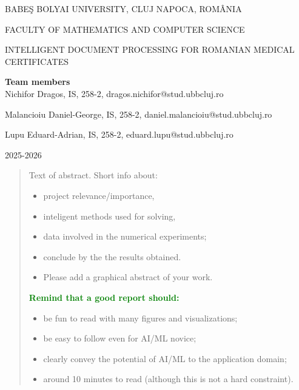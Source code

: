 \documentclass[runningheads,a4paper,11pt]{report}
\begin{document}
\begin{titlepage}
\sloppy

\begin{center}
BABE\c S BOLYAI UNIVERSITY, CLUJ NAPOCA, ROM\^ ANIA

FACULTY OF MATHEMATICS AND COMPUTER SCIENCE

\vspace{6cm}

\Huge \textbf{}

\vspace{1cm}

\normalsize INTELLIGENT DOCUMENT PROCESSING FOR ROMANIAN MEDICAL CERTIFICATES

\end{center}


\vspace{5cm}

\begin{flushright}
\Large{\textbf{Team members}}\\
Nichifor Dragos, IS, 258-2, dragos.nichifor@stud.ubbcluj.ro

Malancioiu Daniel-George, IS, 258-2, daniel.malancioiu@stud.ubbcluj.ro

Lupu Eduard-Adrian, IS, 258-2, eduard.lupu@stud.ubbcluj.ro
\end{flushright}

\vspace{4cm}

\begin{center}
2025-2026
\end{center}

\end{titlepage}


\begin{abstract}
	Text of abstract. Short info about: 
	\begin{itemize}
		\item project relevance/importance, 
		\item inteligent methods used for solving, 
		\item data involved in the numerical experiments; 
		\item conclude by the the results obtained.
		\item Please add a graphical abstract of your work. 
	\end{itemize}

	

\noindent
\textbf{\textcolor{green}{Remind that a good report should:}}
\begin{itemize}	
	\item be fun to read with many figures and visualizations;
	\item be easy to follow even for AI/ML novice;
	\item clearly convey the potential of AI/ML to the application domain;
	\item around 10 minutes to read (although this is not a hard constraint).
\end{itemize}

\end{abstract}
\end{document}
